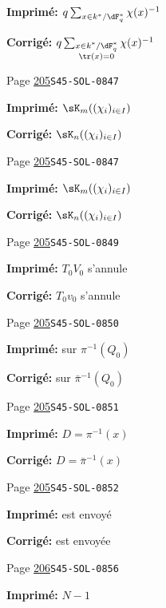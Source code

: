 \begin{description}
\par\noindent\textbf{Imprimé:} \(q\sum_{x\in k^\ast/\dF_q^\ast} \chi(x)^{-1}\)
\par\noindent\textbf{Corrigé:} \(q\sum_{\substack{x\in k^\ast/\dF_q^\ast\\\tr(x)=0}} \chi(x)^{-1}\)
\smallskip
\item[\hypertarget{apparatus:FR-0195}{195}] Page \hyperlink{printpage:fr:205}{205}\quad\texttt{S45-SOL-0847}
\par\noindent\textbf{Imprimé:} \(\sK_m((\chi_i)_{i\in I})\)
\par\noindent\textbf{Corrigé:} \(\sK_n((\chi_i)_{i\in I})\)
\smallskip
\item[\hypertarget{apparatus:FR-0196}{196}] Page \hyperlink{printpage:fr:205}{205}\quad\texttt{S45-SOL-0847}
\par\noindent\textbf{Imprimé:} \(\sK_m((\chi_i)_{i\in I})\)
\par\noindent\textbf{Corrigé:} \(\sK_n((\chi_i)_{i\in I})\)
\smallskip
\item[\hypertarget{apparatus:FR-0197}{197}] Page \hyperlink{printpage:fr:205}{205}\quad\texttt{S45-SOL-0849}
\par\noindent\textbf{Imprimé:} $T_0 V_0$ s'annule
\par\noindent\textbf{Corrigé:} $T_0 v_0$ s'annule
\smallskip
\item[\hypertarget{apparatus:FR-0198}{198}] Page \hyperlink{printpage:fr:205}{205}\quad\texttt{S45-SOL-0850}
\par\noindent\textbf{Imprimé:} sur $\pi^{-1}(Q_0)$
\par\noindent\textbf{Corrigé:} sur $\bar\pi^{-1}(Q_0)$
\smallskip
\item[\hypertarget{apparatus:FR-0199}{199}] Page \hyperlink{printpage:fr:205}{205}\quad\texttt{S45-SOL-0851}
\par\noindent\textbf{Imprimé:} $D=\pi^{-1}(x)$
\par\noindent\textbf{Corrigé:} $D=\bar\pi^{-1}(x)$
\smallskip
\item[\hypertarget{apparatus:FR-0200}{200}] Page \hyperlink{printpage:fr:205}{205}\quad\texttt{S45-SOL-0852}
\par\noindent\textbf{Imprimé:} est envoyé
\par\noindent\textbf{Corrigé:} est envoyée
\smallskip
\item[\hypertarget{apparatus:FR-0201}{201}] Page \hyperlink{printpage:fr:206}{206}\quad\texttt{S45-SOL-0856}
\par\noindent\textbf{Imprimé:} \(N-1\)

\end{description}
